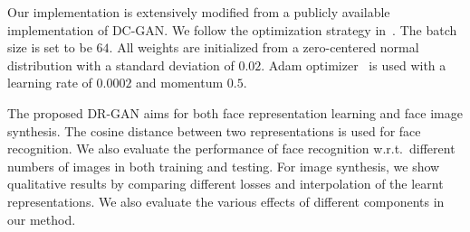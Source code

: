 \documentclass[10pt,journal,compsoc]{IEEEtran}
\begin{document}
Our implementation is extensively modified from a publicly available implementation of DC-GAN. 
We follow the optimization strategy in~\cite{radford2015unsupervised}.
The batch size is set to be $64$. 
All weights are initialized from a zero-centered normal distribution with a standard deviation of $0.02$. 
Adam optimizer~\cite{kingma2014adam} is used with a learning rate of $0.0002$ and momentum $0.5$.

The proposed DR-GAN aims for both face representation learning and face image synthesis. 
The cosine distance between two representations is used for face recognition. 
%
We also evaluate the performance of face recognition w.r.t.~different numbers of images in both training and testing. 
For image synthesis, we show qualitative results by comparing different losses and interpolation of the learnt representations. 
We also evaluate the various effects of different components in our method. 
\end{document}
